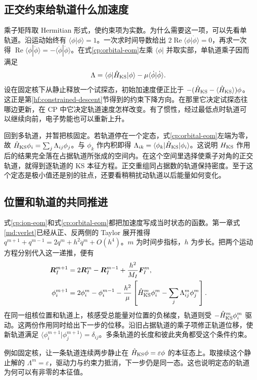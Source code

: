 \subsection{正交约束给轨道什么加速度}
乘子矩阵取 Hermitian 形式，使约束项为实数。为什么需要这一项，可以先看单轨道。沿运动始终有 $\langle\phi|\phi\rangle=1$。一次求时间导数给出 $2\operatorname{Re}\langle\phi|\dot\phi\rangle=0$，再求一次得 $\operatorname{Re}\langle\phi|\ddot\phi\rangle=-\langle\dot\phi|\dot\phi\rangle$。在式\eqref{cp:orbital-eom}左乘 $\langle\phi|$ 并取实部，单轨道乘子因而满足
\[
 \Lambda=\langle\phi|\hat H_{\rm KS}|\phi\rangle-\mu\langle\dot\phi|\dot\phi\rangle .
\]
设在固定核下从静止释放一个试探态，初始加速度便正比于 $-(\hat H_{\rm KS}-\langle\hat H_{\rm KS}\rangle)\phi$。这正是第\ref{hf:constrained-descent}节得到的约束下降方向。在那里它决定试探态往哪边更新，在 CP 中它决定轨道速度怎样改变。有了惯性，经过最低点时轨道可以继续向前，电子势能也可以重新上升。

回到多轨道，并暂把核固定。若轨道停在一个定态，式\eqref{cp:orbital-eom}左端为零，故 $\hat H_{\rm KS}\phi_i=\sum_j\Lambda_{ij}\phi_j$。与 $\phi_k$ 作内积即得 $\Lambda_{ik}=\langle\phi_k|\hat H_{\rm KS}|\phi_i\rangle$。这说明 $H_{\rm KS}$ 作用后的结果完全落在占据轨道所张成的空间内。在这个空间里选择使乘子对角的正交轨道，就得到逐轨道的 KS 本征方程。正交重组同占据数的轨道保持密度。至于这个定态是极小值还是别的驻点，还要看稍稍扰动轨道以后能量如何变化。

\subsection{位置和轨道的共同推进}
式\eqref{cp:ion-eom}和式\eqref{cp:orbital-eom}都把加速度写成当时状态的函数。第一章式\eqref{md:verlet}已经从正、反两侧的 Taylor 展开推得 $q^{m+1}+q^{m-1}=2q^m+h^2\ddot q^m+O(h^4)$。$m$ 为时间步指标，$h$ 为步长。把两个运动方程分别代入这一递推，便有
\begin{align}
 \bm R_I^{m+1}&=2\bm R_I^m-\bm R_I^{m-1}+\frac{h^2}{M_I}\bm F_I^m,\\
 \phi_i^{m+1}&=2\phi_i^m-\phi_i^{m-1}
 -\frac{h^2}{\mu}\left[\hat H_{\rm KS}^m\phi_i^m-\sum_j\Lambda_{ij}^m\phi_j^m\right].
 \label{cp:orbital-verlet}
\end{align}
在同一组核位置和轨道上，核感受总能量对位置的负梯度，轨道则受 $-\hat H_{\rm KS}^m\phi_i^m$ 驱动。这两份作用同时给出下一步的位移。沿旧占据轨道的乘子项修正轨道位移，使新轨道满足 $\langle\phi_i^{m+1}|\phi_j^{m+1}\rangle=\delta_{ij}$。多条轨道的长度和彼此夹角都受这个条件约束。

例如固定核，让一条轨道连续两步静止在 $\hat H_{\rm KS}\phi=\varepsilon\phi$ 的本征态上。取接续这个静止解的 $\Lambda^m=\varepsilon$，驱动力与约束力抵消，下一步仍是同一态。这也说明定态的轨道为何可以有非零的本征值。

